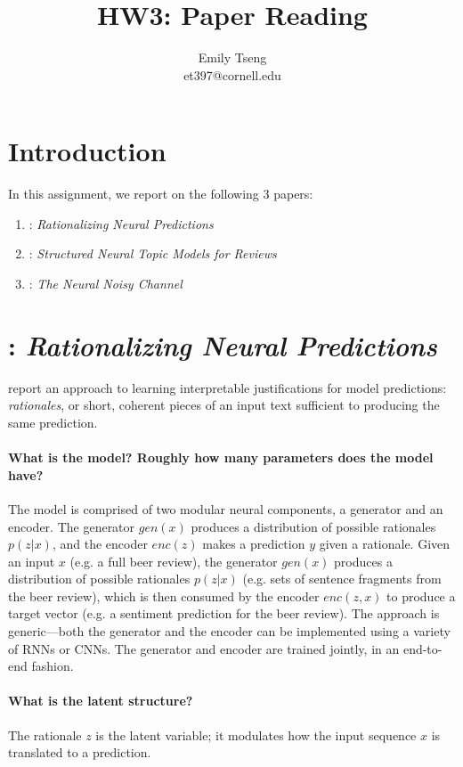 \documentclass[11pt]{article}
\title{HW3: Paper Reading}
\author{Emily Tseng \\ et397@cornell.edu }
\begin{document}
\maketitle{}
\section{Introduction}

In this assignment, we report on the following 3 papers:
\begin{enumerate}
  \item \cite{lei2016rationalizing}: \textit{Rationalizing Neural Predictions}
  \item \cite{esmaeili2018structured}: \textit{Structured Neural Topic Models for Reviews}
  \item \cite{yu2016neural}: \textit{The Neural Noisy Channel}
\end{enumerate}

\section{\cite{lei2016rationalizing}: \textit{Rationalizing Neural Predictions}}

\cite{lei2016rationalizing} report an approach to learning interpretable justifications for model predictions: \textit{rationales}, or short, coherent pieces of an input text sufficient to producing the same prediction.

\paragraph{What is the model? Roughly how many parameters does the model have?} The model is comprised of two modular neural components, a generator and an encoder. The generator $gen(x)$ produces a distribution of possible rationales $p(z|x)$, and the encoder $enc(z)$ makes a prediction $y$ given a rationale. Given an input $x$ (e.g. a full beer review), the generator $gen(x)$ produces a distribution of possible rationales $p(z|x)$ (e.g. sets of sentence fragments from the beer review), which is then consumed by the encoder $enc(z,x)$ to produce a target vector (e.g. a sentiment prediction for the beer review). The approach is generic---both the generator and the encoder can be implemented using a variety of RNNs or CNNs. The generator and encoder are trained jointly, in an end-to-end fashion.

\paragraph{What is the latent structure?} The rationale $z$ is the latent variable; it modulates how the input sequence $x$ is translated to a prediction.
\end{document}
